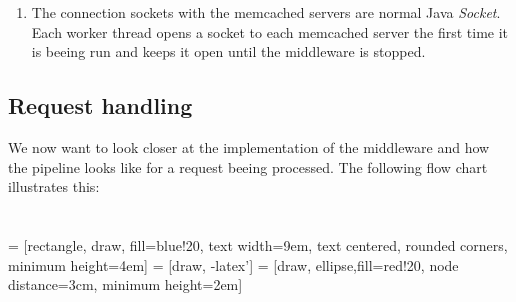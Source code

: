 \documentclass[11pt,a4paper]{article}
\begin{document}
\begin{enumerate}[ {(}1{)} ]
\item The connection sockets with the memcached servers are normal Java \textit{Socket}. Each worker thread opens a socket to each memcached server the first time it is beeing run and keeps it open until the middleware is stopped.  
\end{enumerate}

\subsection{Request handling}
We now want to look closer at the implementation of the middleware and how the pipeline looks like for a request beeing processed. The following flow chart illustrates this:
\\
\\\\
 = [rectangle, draw, fill=blue!20, 
    text width=9em, text centered, rounded corners, minimum height=4em]
 = [draw, -latex']
 = [draw, ellipse,fill=red!20, node distance=3cm,
    minimum height=2em]   
\end{document}
